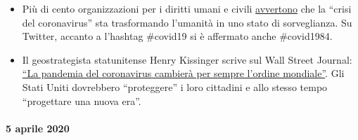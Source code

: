 \begin{itemize}
{  salite alle stelle fino a oltre sei milioni} (vedi grafico), una cifra
  senza precedenti dalla Grande Depressione del 1929.
\item
  Più di cento organizzazioni per i diritti umani e civili
  \href{https://www.dailymail.co.uk/news/article-8181381/World-sleepwalking-surveillance-state-rights-groups-warn.html}{avvertono}
  che la ``crisi del coronavirus'' sta trasformando l'umanità in uno
  stato di sorveglianza. Su Twitter, accanto a l'hashtag \#covid19 si è
  affermato anche \#covid1984.~
\item
  Il geostrategista statunitense Henry Kissinger scrive sul Wall Street
  Journal:
  \href{https://www.wsj.com/articles/the-coronavirus-pandemic-will-forever-alter-the-world-order-11585953005}{``La
  pandemia del coronavirus cambierà per sempre l'ordine mondiale''}. Gli
  Stati Uniti dovrebbero ``proteggere'' i loro cittadini e allo stesso
  tempo ``progettare una nuova era''.
\end{itemize}

\hypertarget{5-aprile-2020}{%
\paragraph{5 aprile 2020}\label{5-aprile-2020}}

